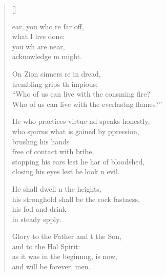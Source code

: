 \settowidth{\versewidth}{Who of us can live with the everlasting flames?”}
\begin{verse}[\versewidth]
  \begin{patverse}
ear, you who re far off,\Med\\
what I hve done;\\
you wh are near,\Med\\
acknowledge m might.

On Zion sinners re in dread,\Med\\
trembling grips th impious;\\
“Who of us can live with the consming fire?\Med\\
Who of us can live with the everlast\pointup{\i}ng flames?”

He who practices virtue nd speaks honestly,\Med\\
who spurns what is gained by ppression,\\
brush\pointup{\i}ng his hands\Med\\
free of contact with  bribe,\\
stopping his ears lest he har of bloodshed,\Med\\
closing his eyes lest he look n evil.

He shall dwell n the heights,\Med\\
his stronghold shall be the rock fastness,\\
his fod and drink\Med\\
in steady spply.

Glory to the Father and t the Son,\Med\\
and to the Hol Spirit:\\
as it was in the beginn\pointup{\i}ng, is now,\Med\\
and will be forever. men. 
  \end{patverse}
\end{verse}
